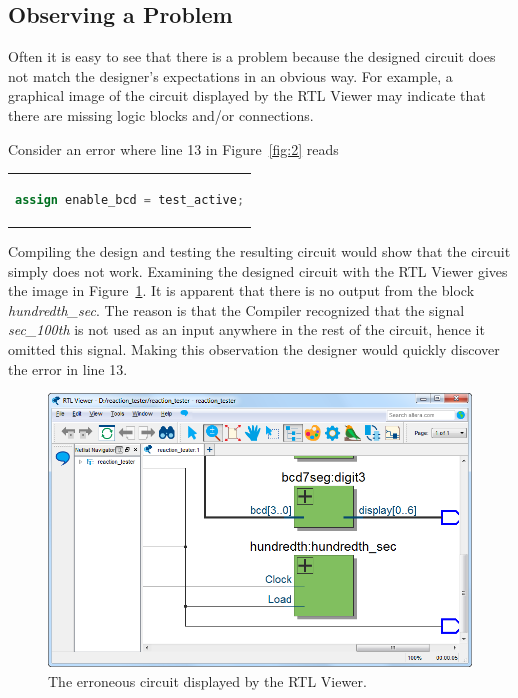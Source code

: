 \documentclass[11pt, twoside, pdftex]{article}
\begin{document}
\subsection{Observing a Problem}
Often it is easy to see that there is a problem because the designed circuit
does not match the designer's expectations in an obvious way.
For example, a graphical image of the circuit displayed by the RTL Viewer
may indicate that there are missing logic blocks and/or connections.

Consider an error where line 13 in Figure~\ref{fig:2} reads
\begin{center}
\begin{tabular}{c}
\begin{lstlisting}[language=Verilog]
assign enable_bcd = test_active;
\end{lstlisting}
\end{tabular}
\end{center}

\noindent
Compiling the design and testing the resulting circuit would show that the
circuit simply does not work. Examining the designed circuit with the RTL Viewer
gives the image in Figure~\ref{fig:21}. It is apparent that there is no output from
the block {\it hundredth\_sec}. The reason is that the Compiler recognized
that the signal {\it sec\_100th} is not used as an input anywhere in the
rest of the circuit, hence it omitted this signal.
Making this observation the designer would quickly discover the error in line 13.

\begin{figure}[H]
   \begin{center}
      \includegraphics[scale=0.60]{figures/figure21.png}
   \caption{The erroneous circuit displayed by the RTL Viewer.} 
	 \label{fig:21}
	 \end{center}
\end{figure}
\end{document}
